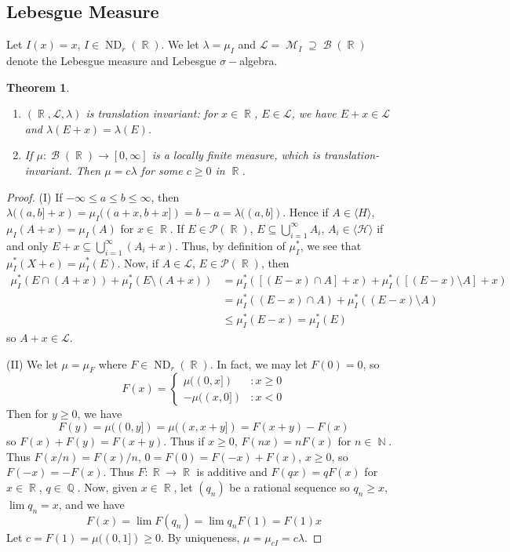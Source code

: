 \documentclass[12pt, a4paper]{memoir}
\DeclareMathOperator{\N}{{\mathbb{N}}}
\DeclareMathOperator{\Q}{{\mathbb{Q}}}
\DeclareMathOperator{\R}{{\mathbb{R}}}
\newtheorem{theorem}{Theorem}[section]
\theoremstyle{nonumberplain}
\newtheorem{proof}{Proof}
\DeclareMathOperator{\M}{\mathcal{M}}
\DeclareMathOperator{\B}{\mathcal{B}}
\DeclareMathOperator{\ND}{ND}
\begin{document}
\subsection{Lebesgue Measure}
Let $I(x)=x$, $I\in\ND_r(\R)$.
We let $\lambda=\mu_I$ and $\mathcal{L}=\M_I\supseteq\B(\R)$ denote the Lebesgue measure and Lebesgue $\sigma-$algebra.
\begin{theorem}
    \begin{enumerate}[nolistsep]
        \item $(\R,\mathcal{L},\lambda)$ is translation invariant: for $x\in\R$, $E\in\mathcal{L}$, we have $E+x\in\mathcal{L}$ and $\lambda(E+x)=\lambda(E)$.
        \item If $\mu:\B(\R)\to[0,\infty]$ is a locally finite measure, which is translation-invariant.
            Then $\mu=c\lambda$ for some $c\geq 0$ in $\R$.
    \end{enumerate}
\end{theorem}
\begin{proof}
    (I) If $-\infty\leq a\leq b\leq\infty$, then $\lambda((a,b]+x)=\mu_I((a+x,b+x])=b-a=\lambda((a,b])$.
    Hence if $A\in\langle H\rangle$, $\mu_I(A+x)=\mu_I(A)$ for $x\in\R$.
    If $E\in\mathcal{P}(\R)$, $E\subseteq\bigcup_{i=1}^\infty A_i$, $A_i\in\langle\mathcal{H}\rangle$ if and only $E+x\subseteq\bigcup_{i=1}^\infty(A_i+x)$.
    Thus, by definition of $\mu_I^*$, we see that $\mu_I^*(X+e)=\mu_I^*(E)$.
    Now, if $A\in\mathcal{L}$, $E\in\mathcal{P}(\R)$, then
    \begin{align*}
        \mu_I^*(E\cap (A+x))+\mu_I^*(E\setminus(A+x)) &= \mu_I^*([(E-x)\cap A]+x)+\mu_I^*([(E-x)\setminus A]+x)\\
                                                      &= \mu_I^*((E-x)\cap A)+\mu_I^*((E-x)\setminus A)\\
                                                      &\leq \mu_I^*(E-x)=\mu_I^*(E)
    \end{align*}
    so $A+x\in\mathcal{L}$.
    
    (II) We let $\mu=\mu_F$ where $F\in\ND_r(\R)$.
    In fact, we may let $F(0)=0$, so
    \begin{equation*}
        F(x)=\begin{cases} \mu((0,x]) &:x\geq 0\\-\mu((x,0])&:x<0\end{cases}
    \end{equation*}
    Then for $y\geq 0$, we have
    \begin{equation*}
        F(y)=\mu((0,y])=\mu((x,x+y])=F(x+y)-F(x)
    \end{equation*}
    so $F(x)+F(y)=F(x+y)$.
    Thus if $x\geq 0$, $F(nx)=nF(x)$ for $n\in\N$.
    Thus $F(x/n)=F(x)/n$, $0=F(0)=F(-x)+F(x)$, $x\geq 0$, so $F(-x)=-F(x)$.
    Thus $F:\R\to\R$ is additive and $F(qx)=qF(x)$ for $x\in\R$, $q\in\Q$.
    Now, given $x\in\R$, let $(q_n)$ be a rational sequence so $q_n\geq x$, $\lim q_n=x$, and we have
    \begin{equation*}
        F(x)=\lim F(q_n)=\lim q_nF(1)=F(1)x
    \end{equation*}
    Let $c=F(1)=\mu((0,1])\geq 0$.
    By uniqueness, $\mu=\mu_{cI}=c\lambda$.
\end{proof}
\end{document}
